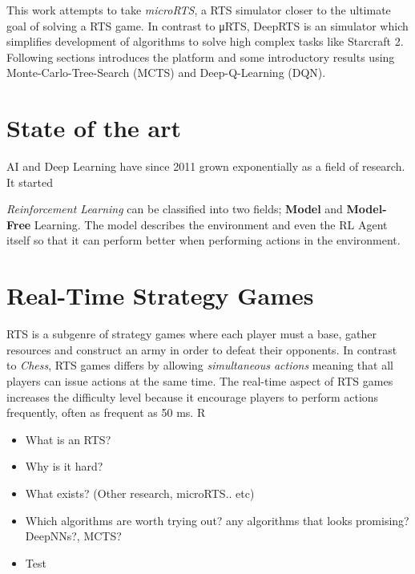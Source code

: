 \documentclass[fleqn,10pt]{article} %
\begin{document}
This work attempts to take \textit{microRTS}, a RTS simulator closer to the ultimate goal of solving a RTS game. In contrast to μRTS, DeepRTS is an simulator which simplifies development of algorithms to solve high complex tasks like Starcraft 2. Following sections introduces the platform and some introductory results using Monte-Carlo-Tree-Search (MCTS) and Deep-Q-Learning (DQN).

\section{State of the art} %

AI and Deep Learning have since 2011 grown exponentially as a field of research. 
It started

\textit{Reinforcement Learning} can be classified into two fields; \textbf{Model} and\textbf{ Model-Free} Learning. The model describes the environment and even the RL Agent itself so that it can perform better when performing actions in the environment.



\section{Real-Time Strategy Games}
RTS is a subgenre of strategy games where each player must a base, gather resources and construct an army in order to defeat their opponents. In contrast to \textit{Chess}, RTS games differs by allowing \textit{simultaneous actions} meaning that all players can issue actions at the same time. The real-time aspect of RTS games increases the difficulty level because it encourage players to perform actions frequently, often as frequent as 50 ms. R


\begin{itemize}
    \item What is an RTS?
    \item Why is it hard?
    \item What exists? (Other research, microRTS.. etc)
    \item Which algorithms are worth trying out? any algorithms that looks promising? DeepNNs?, MCTS?
    \item Test
\end{itemize}
\end{document}
